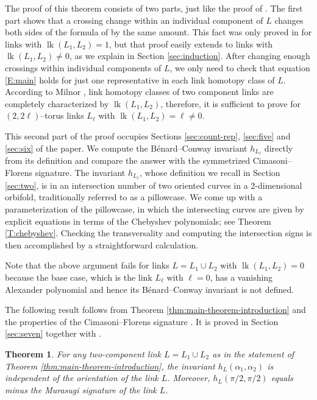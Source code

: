 \documentclass[11pt,reqno]{amsart}
\newtheorem{theorem}{Theorem}[section]
\theoremstyle{definition}
\newcommand{\lk}{\operatorname{lk}}
\begin{document}
\begin{sloppypar}
The proof of this theorem consists of two parts, just like the proof of \cite[Theorem 1.1]{Benard-Conway}. The first part shows that a crossing change within an individual component of $L$ changes both sides of the formula of  by the same amount. This fact was only proved in \cite[Theorem 1.1]{Benard-Conway} for links with $\lk(L_1, L_2) = 1$, but that proof easily extends to links with $\lk(L_1, L_2) \neq 0$, as we explain in Section \ref{sec:induction}. After changing enough crossings within individual components of $L$, we only need to check that equation \eqref{E:main} holds for just one representative in each link homotopy class of $L$. According to Milnor \cite{Milnor1}, link homotopy classes of two component links are completely characterized by $\lk(L_1, L_2)$, therefore, it is sufficient to prove  for $(2, 2 \ell)$--torus links $L_{\ell}$ with $\lk(L_1, L_2) = \ell \neq 0$. 

This second part of the proof occupies Sections \ref{sec:count-rep}, \ref{sec:five} and \ref{sec:six} of the paper. We compute the Bénard--Conway invariant $h_{L_{\ell}}$ directly from its definition and compare the answer with the symmetrized Cimasoni--Florens signature. The invariant $h_{L_{\ell}}$, whose definition we recall in Section \ref{sec:two}, is in an intersection number of two oriented curves in a $2$-dimensional orbifold, traditionally referred to as a pillowcase. We come up with a parameterization of the pillowcase, in which the intersecting curves are given by explicit equations in terms of the Chebyshev polynomials; see Theorem \ref{T:chebyshev}. Checking the transversality and computing the intersection signs is then accomplished by a straightforward calculation. 

Note that the above argument fails for links $L = L_1 \cup L_2$ with $\lk (L_1,L_2) = 0$ because the base case, which is the link $L_{\ell}$ with $\ell = 0$, has a vanishing Alexander polynomial and hence its B{\'e}nard--Conway invariant is not defined. 

The following result follows from Theorem \ref{thm:main-theorem-introduction} and the properties of the Cimasoni--Florens signature \cite{Cimasoni-Florens}. It is proved in Section \ref{sec:seven} together with .

\begin{theorem}
For any two-component link $L = L_1 \cup L_2$ as in the statement of Theorem \ref{thm:main-theorem-introduction}, the invariant $h_L (\alpha_1, \alpha_2)$ is independent of the orientation of the link $L$. Moreover, $h_L (\pi/2,\pi/2)$ equals minus the Murasugi signature \cite{Murasugi} of the link $L$.  
\end{theorem}


\end{sloppypar}
\end{document}
